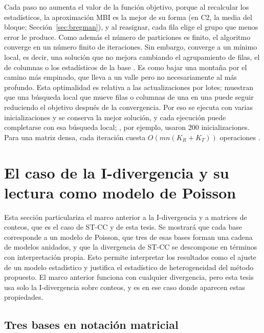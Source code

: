Cada paso no aumenta el valor de la función objetivo, porque al recalcular los
estadísticos, la aproximación MBI es la mejor de su forma (en C2, la media del
bloque; Sección~\ref{sec:bregman}), y al reasignar, cada fila elige el grupo que menos
error le produce. Como además el número de particiones es finito, el algoritmo
converge en un número finito de iteraciones. Sin embargo, converge a un mínimo
local, es decir, una solución que no mejora cambiando el agrupamiento de filas, el de
columnas o los estadísticos de la base \citep[Teorema~6]{Banerjee2007}. Es como
bajar una montaña por el camino más empinado, que lleva a un valle pero no
necesariamente al más profundo. Esta optimalidad es relativa a las
actualizaciones por lotes; \citet{Cho2004} muestran que una búsqueda local que
mueve filas o columnas de una en una puede seguir reduciendo el objetivo después
de la convergencia. Por eso se ejecuta con varias inicializaciones y se conserva
la mejor solución, y cada ejecución puede completarse con esa búsqueda local;
\citet{Liu2021}, por ejemplo, usaron 200 inicializaciones. Para una matriz densa,
cada iteración cuesta $O\!\left(mn(K_R + K_T)\right)$ operaciones
\citep[Sec.~4.4]{Cho2004}.

\section{El caso de la I-divergencia y su lectura como modelo de Poisson}\label{sec:idiv-poisson}

Esta sección particulariza el marco anterior a la I-divergencia y a matrices de
conteos, que es el caso de ST-CC y de esta tesis. Se mostrará que cada base
corresponde a un modelo de Poisson, que tres de esas bases forman una cadena de
modelos anidados, y que la divergencia de ST-CC se descompone en términos con
interpretación propia. Esto permite interpretar los resultados como el ajuste de
un modelo estadístico y justifica el estadístico de heterogeneidad del método
propuesto. El marco anterior funciona con cualquier divergencia, pero esta tesis
usa solo la I-divergencia sobre conteos, y es en ese caso donde aparecen estas
propiedades.

\subsection{Tres bases en notación matricial}

